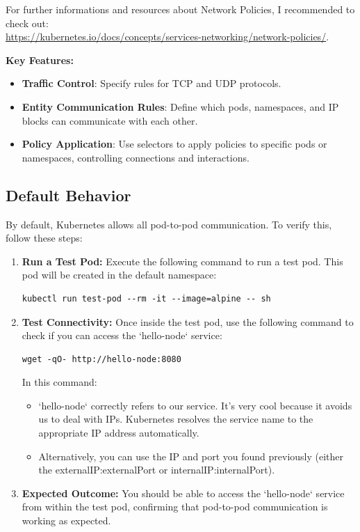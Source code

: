 \documentclass{article}
\begin{document}
For further informations and resources about Network Policies, I recommended to check out: \\
\footnotesize\url{https://kubernetes.io/docs/concepts/services-networking/network-policies/}. \\

\normalsize

\textbf{Key Features:}
\begin{itemize}
    \item \textbf{Traffic Control}: Specify rules for TCP and UDP protocols.
    \item \textbf{Entity Communication Rules}: Define which pods, namespaces, and IP blocks can communicate with each other.
    \item \textbf{Policy Application}: Use selectors to apply policies to specific pods or namespaces, controlling connections and interactions.
\end{itemize}

\subsection{Default Behavior}

By default, Kubernetes allows all pod-to-pod communication. To verify this, follow these steps:

\begin{enumerate}
    \item \textbf{Run a Test Pod:}
    Execute the following command to run a test pod. This pod will be created in the default namespace:
    \begin{lstlisting}
kubectl run test-pod --rm -it --image=alpine -- sh
    \end{lstlisting}

    \item \textbf{Test Connectivity:}
    Once inside the test pod, use the following command to check if you can access the `hello-node` service:
    \begin{lstlisting}
wget -qO- http://hello-node:8080
    \end{lstlisting}
    In this command:
    \begin{itemize}
        \item `hello-node` correctly refers to our service. It's very cool because it avoids us to deal with IPs. Kubernetes resolves the service name to the appropriate IP address automatically.
        \item Alternatively, you can use the IP and port you found previously (either the externalIP:externalPort or internalIP:internalPort).
    \end{itemize}

    \item \textbf{Expected Outcome:}
    You should be able to access the `hello-node` service from within the test pod, confirming that pod-to-pod communication is working as expected.
\end{enumerate}
\end{document}
